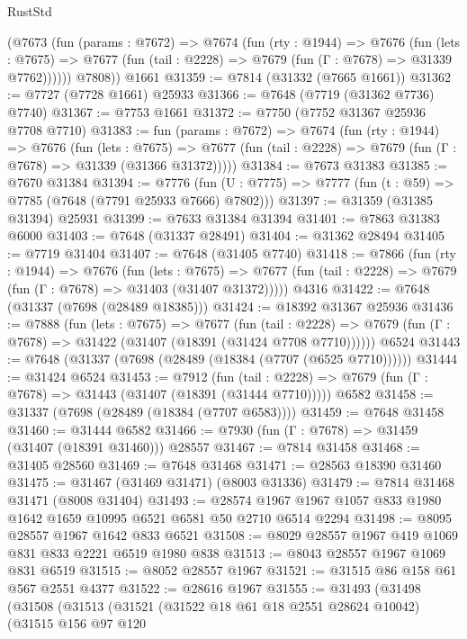 \begin{lexlean}{RustStd}
\begin{coremodule}
        (@7673
          (fun (params : @7672) =>
          @7674
            (fun (rty : @1944) =>
            @7676
              (fun (lets : @7675) =>
              @7677 (fun (tail : @2228) => @7679 (fun (Γ : @7678) => @31339 @7762))))))
        @7808))
    @1661
@31359 := @7814 (@31332 (@7665 @1661))
@31362 := @7727 (@7728 @1661) @25933
@31366 := @7648 (@7719 (@31362 @7736) @7740)
@31367 := @7753 @1661
@31372 := @7750 (@7752 @31367 @25936 @7708 @7710)
@31383 := fun (params : @7672) =>
  @7674
    (fun (rty : @1944) =>
    @7676
      (fun (lets : @7675) =>
      @7677 (fun (tail : @2228) => @7679 (fun (Γ : @7678) => @31339 (@31366 @31372)))))
@31384 := @7673 @31383
@31385 := @7670 @31384
@31394 := @7776
    (fun (U : @7775) => @7777 (fun (t : @59) => @7785 (@7648 (@7791 @25933 @7666) @7802)))
@31397 := @31359 (@31385 @31394) @25931
@31399 := @7633 @31384 @31394
@31401 := @7863 @31383 @6000
@31403 := @7648 (@31337 @28491)
@31404 := @31362 @28494
@31405 := @7719 @31404
@31407 := @7648 (@31405 @7740)
@31418 := @7866
    (fun (rty : @1944) =>
    @7676
      (fun (lets : @7675) =>
      @7677 (fun (tail : @2228) => @7679 (fun (Γ : @7678) => @31403 (@31407 @31372)))))
    @4316
@31422 := @7648 (@31337 (@7698 (@28489 @18385)))
@31424 := @18392 @31367 @25936
@31436 := @7888
    (fun (lets : @7675) =>
    @7677
      (fun (tail : @2228) =>
      @7679 (fun (Γ : @7678) => @31422 (@31407 (@18391 (@31424 @7708 @7710))))))
    @6524
@31443 := @7648 (@31337 (@7698 (@28489 (@18384 (@7707 (@6525 @7710))))))
@31444 := @31424 @6524
@31453 := @7912
    (fun (tail : @2228) => @7679 (fun (Γ : @7678) => @31443 (@31407 (@18391 (@31444 @7710)))))
    @6582
@31458 := @31337 (@7698 (@28489 (@18384 (@7707 @6583))))
@31459 := @7648 @31458
@31460 := @31444 @6582
@31466 := @7930 (fun (Γ : @7678) => @31459 (@31407 (@18391 @31460))) @28557
@31467 := @7814 @31458
@31468 := @31405 @28560
@31469 := @7648 @31468
@31471 := @28563 @18390 @31460
@31475 := @31467 (@31469 @31471) (@8003 @31336)
@31479 := @7814 @31468 @31471 (@8008 @31404)
@31493 := @28574 @1967 @1967 @1057 @833 @1980 @1642 @1659 @10995 @6521 @6581 @50 @2710 @6514 @2294
@31498 := @8095 @28557 @1967 @1642 @833 @6521
@31508 := @8029 @28557 @1967 @419 @1069 @831 @833 @2221 @6519 @1980 @838
@31513 := @8043 @28557 @1967 @1069 @831 @6519
@31515 := @8052 @28557 @1967
@31521 := @31515 @86 @158 @61 @567 @2551 @4377
@31522 := @28616 @1967
@31555 := @31493
    (@31498
      (@31508
        (@31513
          (@31521
            (@31522 @18 @61 @18 @2551 @28624 @10042)
            (@31515
              @156
              @97
              @120

\end{coremodule}
\end{lexlean}
